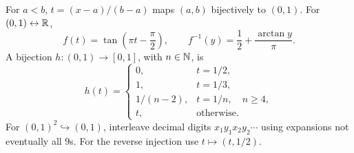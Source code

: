 For $a<b$, $t=(x-a)/(b-a)$ maps $(a,b)$ bijectively to $(0,1)$.
For $(0,1)\leftrightarrow\mathbb{R}$,
\[
  f(t)=\tan\left(\pi t-\frac\pi2\right),\qquad
  f^{-1}(y)=\frac12+\frac{\arctan y}{\pi}.
\]
A bijection $h:(0,1)\to[0,1]$, with $n\in\mathbb{N}$, is
\[
  h(t)=
  \begin{cases}
    0,&t=1/2,\\
    1,&t=1/3,\\
    1/(n-2),&t=1/n,\quad n\ge4,\\
    t,&\text{otherwise}.
  \end{cases}
\]
For $(0,1)^2\hookrightarrow(0,1)$, interleave decimal digits
$x_1y_1x_2y_2\cdots$ using expansions not eventually all $9$s.
For the reverse injection use $t\mapsto(t,1/2)$.
